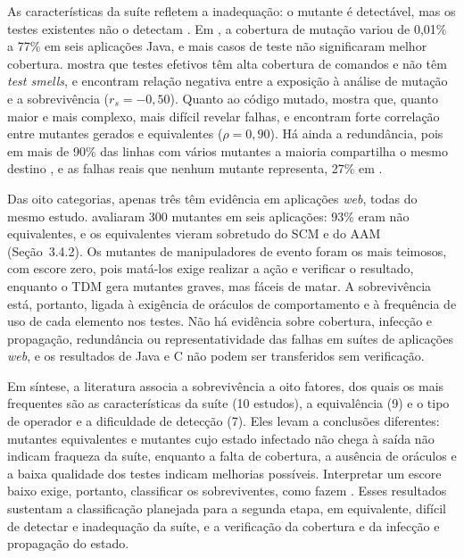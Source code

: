 As características da suíte refletem a inadequação: o mutante é detectável, mas os testes existentes não o detectam \cite{inozemtseva2013}. Em , a cobertura de mutação variou de 0,01\% a 77\% em seis aplicações Java, e mais casos de teste não significaram melhor cobertura.  mostra que testes efetivos têm alta cobertura de comandos e não têm \textit{test smells}, e  encontram relação negativa entre a exposição à análise de mutação e a sobrevivência ($r_s = -0,50$). Quanto ao código mutado,  mostra que, quanto maior e mais complexo, mais difícil revelar falhas, e  encontram forte correlação entre mutantes gerados e equivalentes ($\rho = 0,90$). Há ainda a redundância, pois em mais de 90\% das linhas com vários mutantes a maioria compartilha o mesmo destino \cite{petrovic2021}, e as falhas reais que nenhum mutante representa, 27\% em .

Das oito categorias, apenas três têm evidência em aplicações \textit{web}, todas do mesmo estudo.  avaliaram 300 mutantes em seis aplicações: 93\% eram não equivalentes, e os equivalentes vieram sobretudo do SCM e do AAM (Seção~3.4.2). Os mutantes de manipuladores de evento foram os mais teimosos, com escore zero, pois matá-los exige realizar a ação e verificar o resultado, enquanto o TDM gera mutantes graves, mas fáceis de matar. A sobrevivência está, portanto, ligada à exigência de oráculos de comportamento e à frequência de uso de cada elemento nos testes. Não há evidência sobre cobertura, infecção e propagação, redundância ou representatividade das falhas em suítes de aplicações \textit{web}, e os resultados de Java e C não podem ser transferidos sem verificação.

Em síntese, a literatura associa a sobrevivência a oito fatores, dos quais os mais frequentes são as características da suíte (10 estudos), a equivalência (9) e o tipo de operador e a dificuldade de detecção (7). Eles levam a conclusões diferentes: mutantes equivalentes e mutantes cujo estado infectado não chega à saída não indicam fraqueza da suíte, enquanto a falta de cobertura, a ausência de oráculos e a baixa qualidade dos testes indicam melhorias possíveis. Interpretar um escore baixo exige, portanto, classificar os sobreviventes, como fazem . Esses resultados sustentam a classificação planejada para a segunda etapa, em equivalente, difícil de detectar e inadequação da suíte, e a verificação da cobertura e da infecção e propagação do estado.

